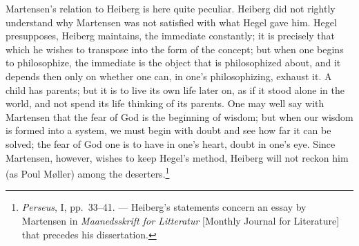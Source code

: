\documentclass[12pt,a4paper]{book}
\begin{document}
Martensen's relation to Heiberg is here quite peculiar. Heiberg did not rightly understand why
Martensen was not satisfied with what Hegel gave him. Hegel presupposes, Heiberg maintains, the
immediate constantly; it is precisely that which he wishes to transpose into the form of the
concept; but when one begins to philosophize, the immediate is the object that is philosophized
about, and it depends then only on whether one can, in one's philosophizing, exhaust it. A child
has parents; but it is to live its own life later on, as if it stood alone in the world, and not
spend its life thinking of its parents. One may well say with Martensen that the fear of God is
the beginning of wisdom; but when our wisdom is formed into a system, we must begin with doubt and
see how far it can be solved; the fear of God one is to have in one's heart, doubt in one's eye.
Since Martensen, however, wishes to keep Hegel's method, Heiberg will not reckon him (as Poul
Møller) among the deserters.\footnote{\emph{Perseus}, I, pp.~33--41. --- Heiberg's statements
concern an essay by Martensen in \emph{Maanedsskrift for Litteratur} [Monthly Journal for
Literature] that precedes his dissertation.}
\end{document}

